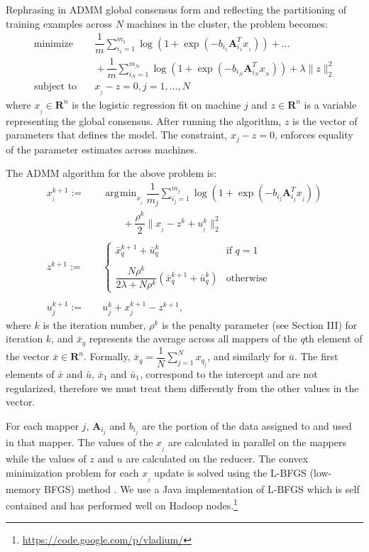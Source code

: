 \documentclass[10pt, conference, compsocconf]{IEEEtran}
\DeclareMathOperator*{\argmin}{arg\!\min}
\begin{document}
Rephrasing in ADMM global consensus form and reflecting the partitioning of training examples across $N$ machines in the cluster, the problem becomes:
\begin{align*}
\text{minimize}&\quad \dfrac{1}{m}\sum_{i_1=1}^{m_1} \log(1 + \exp(-b_{i_1}\mathbf{A}_{i_1}^Tx_{_1}))+\ldots \\
&\quad+\dfrac{1}{m}\sum_{i_N=1}^{m_N} \log(1 + \exp(-b_{i_N}\mathbf{A}_{i_N}^Tx_{_N}))+\lambda\|z\|_2^2\\
\text{subject to}&\quad x_{_j} - z = 0, j = 1, \ldots, N
\end{align*}
where $x_{_j}\in\mathbf{R}^n$ is the logistic regression fit on machine $j$ and $z\in\mathbf{R}^n$ is a variable representing the global consensus.  After running the algorithm, $z$ is the vector of parameters that defines the model. The constraint, $x_j-z=0$, enforces equality of the parameter estimates across machines.

The ADMM algorithm for the above problem is:
\begin{align}
\label{eq:x}
x_{_j}^{k+1} :=&\quad \argmin_{x_{_j}} \dfrac{1}{m_j}\sum_{i_j=1}^{m_j} \log(1 + \exp(-b_{i_j}\mathbf{A}_{i_j}^Tx_{_j})) \\
&\quad\quad\quad+ \dfrac{\rho^k}{2}\|x_{_j} - z^k + u_{_j}^k\|_2^2 \nonumber\\
\nonumber\\
\label{eq:z}
z^{k+1} :=&\quad \begin{cases}
    \bar{x}_q^{k+1} + \bar{u}_q^k& \text{if $q=1$}\\
    \\
    \dfrac{N\rho^k}{2\lambda + N\rho^k}(\bar{x}_q^{k+1} + \bar{u}_q^k)& \text{otherwise}
  \end{cases}\\
\nonumber\\
\label{eq:u}
u_j^{k+1} :=&\quad u_j^k + x_j^{k+1} - z^{k+1},
\end{align}
where $k$ is the iteration number, $\rho^k$ is the penalty parameter (see Section III) for iteration $k$, and $\bar{x}_q$ represents the average across all mappers of the $q$th element of the vector $\bar{x}\in\mathbf{R}^n$.  Formally, $\bar{x}_q = \dfrac{1}{N}\sum_{j=1}^N x_{q_j}$, and similarly for $\bar{u}$.  The first elements of $\bar{x}$ and $\bar{u}$, $\bar{x}_1$ and $\bar{u}_1$, correspond to the intercept and are not regularized, therefore we must treat them differently from the other values in the vector.

For each mapper $j$, $\mathbf{A}_{i_j}$ and $b_{i_j}$ are the portion of the data assigned to and used in that mapper.  The values of the $x_{_j}$ are calculated in parallel on the mappers while the values of $z$ and $u$ are calculated on the reducer.  The convex minimization problem for each $x_{_j}$ update is solved using the L-BFGS (low-memory BFGS) method \cite{bonnans2003numerical}.  We use a Java implementation of L-BFGS which is self contained and has performed well on Hadoop nodes.\footnote{\url{https://code.google.com/p/vladium/}}
\end{document}
